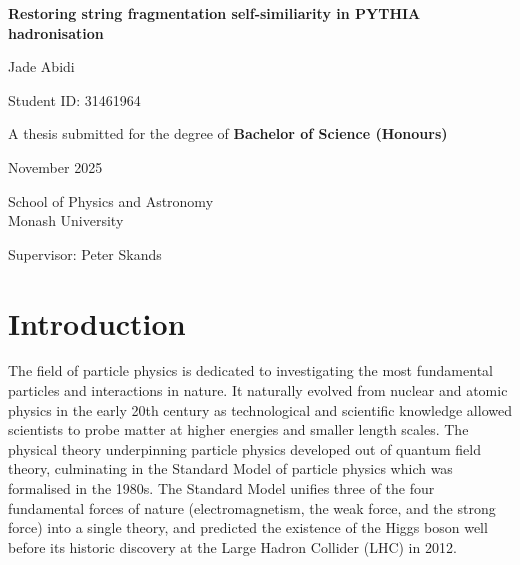 \documentclass[12pt,a4paper]{report}
\begin{document}
\begin{titlepage}
  \centering
  \vspace*{2cm}
  {\LARGE\bfseries Restoring string fragmentation self-similiarity in PYTHIA hadronisation \par}
  \vspace{1.5cm}
  \Large Jade Abidi \par
  \vspace{0.5cm}
  \large Student ID: 31461964 \par
  \vspace{0.5cm}
  {\large A thesis submitted for the degree of \bfseries{Bachelor of Science (Honours)}} \par
  \vspace{0.5cm}
  \large November 2025 \par
  \vspace{0.5cm}
  \vfill
  \large School of Physics and Astronomy \\ Monash University \par
  \vspace{0.5cm}
  \large Supervisor: Peter Skands \par
  \vfill
\end{titlepage}

\pagebreak

\begin{abstract}
Monte Carlo event generators like PYTHIA are used to simulate high-energy particle collision events involving non-perturbative physics. In PYTHIA, the strong field between a $q\bar{q}$ pair is modelled as a classical string with constant tension, implying that the string fragmentation process should be self-similar at all points along the string. This property is currently violated at the step where string ends are joined, causing a dip in the rapidity plateau and anomalous hadronic chemistry. We introduce an additional tunable parameter and a new algorithm for string fragmentation that improve or resolve these issues, albeit with some limitations.
\end{abstract}

\pagebreak

\tableofcontents

\chapter{Introduction}
The field of particle physics is dedicated to investigating the most fundamental particles and interactions in nature. It naturally evolved from nuclear and atomic physics in the early 20th century as technological and scientific knowledge allowed scientists to probe matter at higher energies and smaller length scales. The physical theory underpinning particle physics developed out of quantum field theory, culminating in the Standard Model of particle physics which was formalised in the 1980s. The Standard Model unifies three of the four fundamental forces of nature (electromagnetism, the weak force, and the strong force) into a single theory, and predicted the existence of the Higgs boson well before its historic discovery at the Large Hadron Collider (LHC) in 2012.
\end{document}
